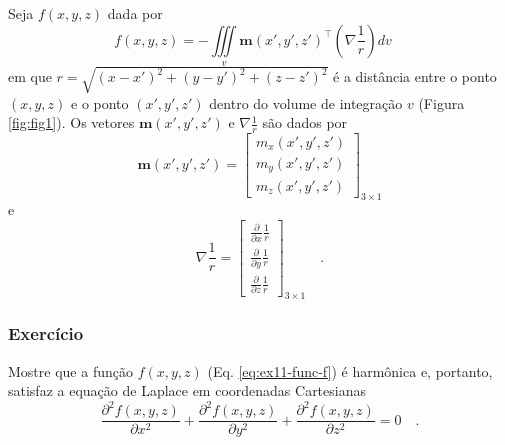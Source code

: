 \documentclass[10pt,a4paper,fleqn]{article}
\begin{document}
Seja $f(x,y,z)$ dada por
\begin{equation}
f(x,y,z) = - \iiint \limits_{v} \mathbf{m}(x',y',z')^{\intercal}
                                \left( \nabla \frac{1}{r} \right)
                                 d v \quad
\label{eq:ex11-func-f}
\end{equation}
em que $r = \sqrt{(x-x')^{2}+(y-y')^{2}+(z-z')^{2}}$ \'{e} a dist\^{a}ncia entre o ponto $(x,y,z)$
e o ponto $(x',y',z')$ dentro do volume de integraç\~{a}o $v$ (Figura \ref{fig:fig1}). Os vetores
$\mathbf{m}(x',y',z')$ e $\nabla \frac{1}{r}$ s\~{a}o dados por
\begin{equation}
\mathbf{m}(x',y',z') =
\left[
\begin{array}{c}
m_{x}(x',y',z') \\
m_{y}(x',y',z') \\
m_{z}(x',y',z')
\end{array}
\right]_{3 \times 1}
\label{eq:ex11-mag-vec}
\end{equation}
e
\begin{equation}
\nabla \frac{1}{r} =
\left[
\begin{array}{c}
\frac{\partial}{\partial x} \frac{1}{r} \\
\frac{\partial}{\partial y} \frac{1}{r} \\
\frac{\partial}{\partial z} \frac{1}{r}
\end{array}
\right]_{3 \times 1} \quad .
\label{eq:ex11-grad-invr}
\end{equation}

\begin{flushleft}
\dotfill
\end{flushleft}

\subsubsection{Exerc\'{i}cio}

Mostre que a funç\~{a}o $f(x,y,z)$ (Eq. \ref{eq:ex11-func-f}) \'{e} harm\^{o}nica e, portanto, satisfaz
a equaç\~{a}o de Laplace em coordenadas Cartesianas
\begin{equation}
\frac{\partial^{2} f(x,y,z)}{\partial x^{2}} +
\frac{\partial^{2} f(x,y,z)}{\partial y^{2}} +
\frac{\partial^{2} f(x,y,z)}{\partial z^{2}} = 0 \quad .
\label{eq:ex11-Laplace}
\end{equation}

\begin{flushleft}
\dotfill
\end{flushleft}
\end{document}
